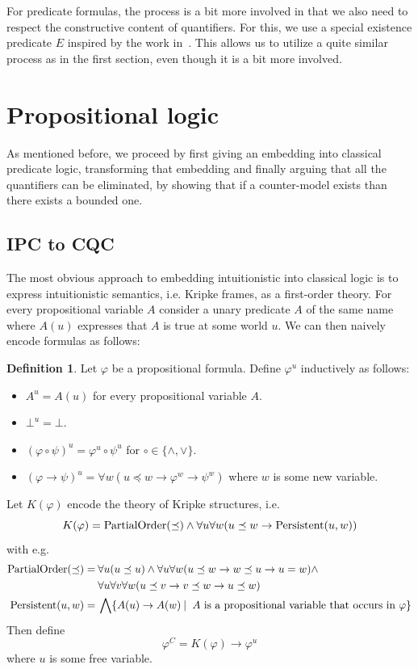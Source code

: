 \documentclass[a4paper,11pt]{report}
\theoremstyle{definition}
\theoremstyle{definition}
\theoremstyle{definition}
\theoremstyle{definition}
\theoremstyle{definition}
\newtheorem{definition}[theorem]{Definition}
\theoremstyle{definition}
\theoremstyle{definition}
\begin{document}
	For predicate formulas, the process is a bit more involved in that we also need to respect the constructive content of quantifiers. For this, we use a special existence predicate $E$ inspired by the work in~\cite{iemhoff2010eskolemization}. This allows us to utilize a quite similar process as in the first section, even though it is a bit more involved.
	
	\section{Propositional logic}
	
	As mentioned before, we proceed by first giving an embedding into classical predicate logic, transforming that embedding and finally arguing that all the quantifiers can be eliminated, by showing that if a counter-model exists than there exists a bounded one.
	
	\subsection{IPC to CQC}
	
	The most obvious approach to embedding intuitionistic into classical logic is to express intuitionistic semantics, i.e. Kripke frames, as a first-order theory. For every propositional variable $A$ consider a unary predicate $A$ of the same name where $A(u)$ expresses that $A$ is true at some world $u$. We can then naively encode formulas as follows:
	
	\begin{definition}
		Let $\varphi$ be a propositional formula. Define $\varphi^{u}$ inductively as follows:
		\begin{itemize}
			\item $A^{u} = A(u)$ for every propositional variable $A$.
			\item $\bot^u = \bot$.
			\item $(\varphi\circ\psi)^u = \varphi^u\circ\psi^u$ for $\circ\in\{\wedge, \vee\}$.
			\item $(\varphi\to \psi)^u = \forall w(u\preceq w\to\varphi^{w}\to\psi^{w})$ where $w$ is some new variable.
		\end{itemize}
		Let $K(\varphi)$ encode the theory of Kripke structures, i.e.
		$$K(\varphi) = \text{\normalfont PartialOrder}(\preceq)\wedge\forall u\forall w(u\preceq w\to \text{\normalfont Persistent}(u, w))$$
		with e.g.
		\begin{align*}
			\text{\normalfont PartialOrder}(\preceq) =&\:\forall u(u\preceq u)\wedge\forall u\forall w(u\preceq w\to w\preceq u\to u = w)\wedge\\&\:\forall u\forall v\forall w(u\preceq v\to v\preceq w\to u\preceq w)\\
			\text{\normalfont Persistent}(u, w)=&\:\bigwedge \{A(u)\to A(w)\:|\: \text{ $A$ is a propositional variable that occurs in $\varphi$}\}
		\end{align*}
		Then define
		$$\varphi^{C} = K(\varphi)\to \varphi^{u}$$
		where $u$ is some free variable.
	\end{definition}
	
\end{document}
